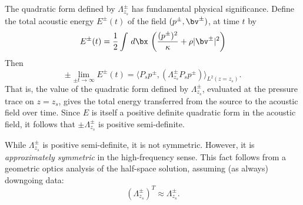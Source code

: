 The quadratic form defined by $\Lambda^{\pm}_{z_s}$ has fundamental
physical significance. Define the total acoustic energy $E^{\pm}(t)$ of the
field $(p^{\pm},\bv^{\pm})$, at time $t$ by
\begin{equation}
  \label{eqn:defae0}
  E^{\pm}(t) = \frac{1}{2} \int \,d\bx \, \left(\frac{(p^{\pm})^2}{\kappa} + \rho |\bv^{\pm}|^2\right)
\end{equation}
Then
\begin{equation}
  \label{eqn:elim}
  \pm \lim_{\pm t \rightarrow \infty} E^{\pm}(t) =  \langle P_sp^{\pm},
  (\Lambda^{\pm}_{z_s} P_sp^{\pm}) \rangle_{L^2(z=z_s)}.
\end{equation}
That is, the value of the quadratic form defined by
$\Lambda^{\pm}_{z_s}$, evaluated at the pressure trace on $z=z_s$,
gives the total energy transferred from the source to the
acoustic field over time. Since $E$ is itself a positive definite
quadratic form in the acoustic field, it follows that $\pm
\Lambda^{\pm}_{z_s}$ is positive semi-definite. 

While $\Lambda^{\pm}_{z_s}$ is positive semi-definite, it is not
symmetric. However, it is {\em approximately symmetric} in the
high-frequency sense. This fact follows from a
geometric optics analysis of the half-space solution,
assuming (as always) downgoing data:
\begin{equation}
  \label{eqn:lamappsim}
  (\Lambda^{\pm}_{z_s})^T \approx \Lambda^{\pm}_{z_s}.
\end{equation}

